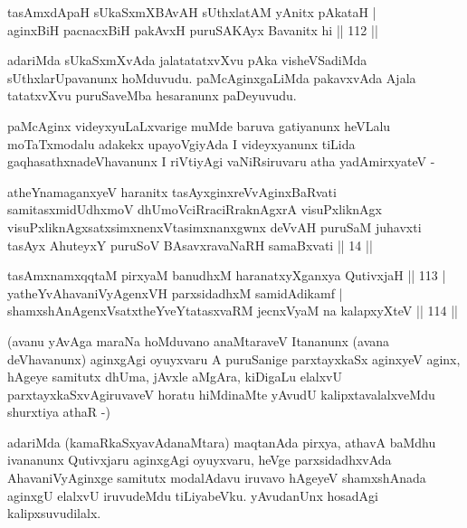 
\begin{shl}
tasAmxdApaH sUkaSxmXBAvAH sUthxlatAM yAnitx pAkataH | \\
aginxBiH pacnacxBiH pakAvxH puruSAKAyx Bavanitx hi \hfill|| 112 || 
\end{shl}

\begin{artha}
adariMda sUkaSxmXvAda jalatatatxvXvu pAka visheVSadiMda
sUthxlarUpavanunx hoMduvudu. paMcAginxgaLiMda pakavxvAda Ajala
tatatxvXvu puruSaveMba hesaranunx paDeyuvudu.
\end{artha}


\begin{artha}
paMcAginx videyxyuLaLxvarige muMde baruva gatiyanunx heVLalu  moTaTxmodalu adakekx upayoVgiyAda I videyxyanunx tiLida gaqhasathxnadeVhavanunx I riVtiyAgi vaNiRsiruvaru atha yadAmirxyateV -
\end{artha}


\begin{shl}
atheYnamaganxyeV haranitx tasAyxginxreVvAginxBaRvati samitasxmidUdhxmoV dhUmoV\s ciRraciRraknAgxrA visuPxliknAgx visuPxliknAgxsatxsimxnenxVtasimxnanxgwnx deVvAH puruSaM juhavxti tasAyx AhuteyxY puruSoV BAsavxravaNaRH samaBxvati || 14 ||
\end{shl}

\begin{shl}
tasAmxnamxqqtaM pirxyaM banudhxM haranatxyXganxya QutivxjaH \hfill|| 113 | \\
yatheYvA\s \s havaniVyAgenxVH parxsidadhxM samidAdikamf | \\
shamxshAnAgenxVsatxtheYveYtatasxvaRM jecnxVyaM na kalapxyXteV \hfill|| 114 || 
\end{shl}

\begin{artha}
(avanu yAvAga maraNa hoMduvano anaMtaraveV Itananunx (avana  deVhavanunx) aginxgAgi oyuyxvaru A puruSanige parxtayxkaSx aginxyeV aginx, hAgeye samitutx dhUma, jAvxle aMgAra, kiDigaLu elalxvU  parxtayxkaSxvAgiruvaveV horatu hiMdinaMte yAvudU kalipxtavalalxveMdu  shurxtiya athaR -)
\end{artha}


\begin{artha}
adariMda (kamaRkaSxyavAdanaMtara) maqtanAda pirxya, athavA baMdhu
ivananunx Qutivxjaru aginxgAgi oyuyxvaru, heVge parxsidadhxvAda
AhavaniVyAginxge samitutx modalAdavu iruvavo hAgeyeV shamxshAnada
aginxgU elalxvU iruvudeMdu tiLiyabeVku. yAvudanUnx hosadAgi
kalipxsuvudilalx.
\end{artha}

